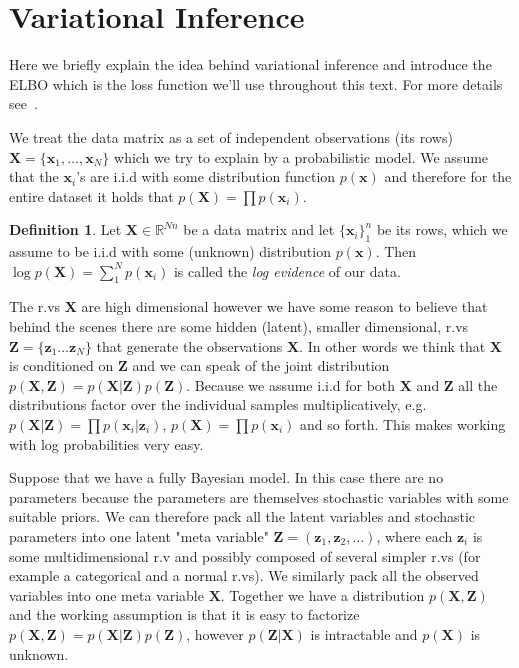 \documentclass[11pt, a4paper]{report}
\theoremstyle{plain}
\theoremstyle{definition}
\newtheorem{mydef}{Definition}[chapter]
\theoremstyle{remark}
\newcommand{\R}{\mathbb{R}}
\newcommand{\bv}[1]{\boldsymbol{#1}}
\begin{document}
\section{Variational Inference}

Here we briefly explain the idea behind variational inference and introduce the
ELBO which is the loss function we'll use throughout this text.
For more details see~.

We treat the data matrix as a set of independent observations (its rows)
$\bv{X} = \{\bv{x}_1, \dots
, \bv{x}_N\}$ which we try to explain by a probabilistic model. 
We assume that
the $\bv{x}_i$'s are i.i.d with some distribution function $p(\bv{x})$ and therefore for
the entire dataset it holds that $p(\bv{X}) = \prod p(\bv{x}_i)$.

\begin{mydef}
\label{def:logevidence}
Let $\bv{X} \in \R^{Nn}$ be a data matrix and let $\{\bv{x}_i\}_1^n$ be its
rows, which we assume to be i.i.d with some (unknown) distribution $p(\bv{x})$.
Then $\log p(\bv{X}) = \sum_1^N p(\bv{x}_i)$ is called the \emph{log evidence} of our
data.
\end{mydef}

The r.vs $\bv{X}$ are high dimensional however
we have some reason to believe that behind the scenes there are some hidden
(latent), smaller dimensional, r.vs
$\bv{Z} = \{\bv{z}_1 \dots \bv{z}_N\}$ that generate the observations $\bv{X}$.
In other words we think that $\bv{X}$ is conditioned on $\bv{Z}$ and we can speak of
the joint distribution $p(\bv{X},\bv{Z}) = p(\bv{X}|\bv{Z})p(\bv{Z})$.
Because we assume i.i.d for both $\bv{X}$ and $\bv{Z}$ all the distributions factor
over the individual samples multiplicatively, e.g.
$p(\bv{X}|\bv{Z}) = \prod p(\bv{x}_i | \bv{z}_i)$,
$p(\bv{X}) = \prod p(\bv{x}_i)$ and so forth. This makes working with log
probabilities very easy.

Suppose that we have a fully Bayesian model. In this case there are no
parameters because the parameters are themselves stochastic variables with some
suitable priors. We can therefore pack all the latent variables and stochastic
parameters into one latent "meta variable" $\bv{Z} = (\bv{z}_1, \bv{z}_2, \dots )$,
where each $\bv{z}_i$
is some multidimensional r.v and possibly composed of several simpler r.vs (for
example a categorical and a normal r.vs).
We similarly pack all the observed variables into one meta variable $\bv{X}$.
Together we have a distribution $p(\bv{X},\bv{Z})$ and the working assumption is that it
is easy to factorize $p(\bv{X},\bv{Z}) = p(\bv{X}|\bv{Z})p(\bv{Z})$,
however $p(\bv{Z}|\bv{X})$ is intractable and
$p(\bv{X})$ is unknown.
\end{document}
